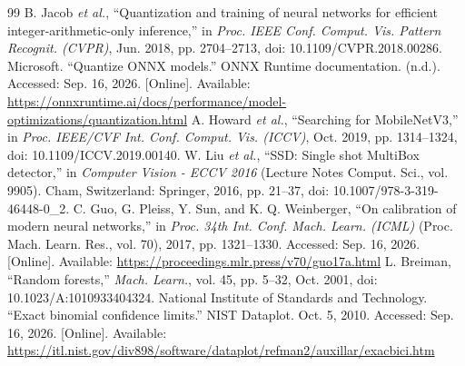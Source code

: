 \begin{thebibliography}{99}
B. Jacob \textit{et al.}, ``Quantization and training of neural networks for efficient integer-arithmetic-only inference,'' in \textit{Proc. IEEE Conf. Comput. Vis. Pattern Recognit. (CVPR)}, Jun. 2018, pp. 2704--2713, doi: 10.1109/CVPR.2018.00286.
Microsoft. ``Quantize ONNX models.'' ONNX Runtime documentation. (n.d.). Accessed: Sep. 16, 2026. [Online]. Available: \url{https://onnxruntime.ai/docs/performance/model-optimizations/quantization.html}
A. Howard \textit{et al.}, ``Searching for MobileNetV3,'' in \textit{Proc. IEEE/CVF Int. Conf. Comput. Vis. (ICCV)}, Oct. 2019, pp. 1314--1324, doi: 10.1109/ICCV.2019.00140.
W. Liu \textit{et al.}, ``SSD: Single shot MultiBox detector,'' in \textit{Computer Vision - ECCV 2016} (Lecture Notes Comput. Sci., vol. 9905). Cham, Switzerland: Springer, 2016, pp. 21--37, doi: 10.1007/978-3-319-46448-0\_2.
C. Guo, G. Pleiss, Y. Sun, and K. Q. Weinberger, ``On calibration of modern neural networks,'' in \textit{Proc. 34th Int. Conf. Mach. Learn. (ICML)} (Proc. Mach. Learn. Res., vol. 70), 2017, pp. 1321--1330. Accessed: Sep. 16, 2026. [Online]. Available: \url{https://proceedings.mlr.press/v70/guo17a.html}
L. Breiman, ``Random forests,'' \textit{Mach. Learn.}, vol. 45, pp. 5--32, Oct. 2001, doi: 10.1023/A:1010933404324.
National Institute of Standards and Technology. ``Exact binomial confidence limits.'' NIST Dataplot. Oct. 5, 2010. Accessed: Sep. 16, 2026. [Online]. Available: \url{https://itl.nist.gov/div898/software/dataplot/refman2/auxillar/exacbici.htm}
\end{thebibliography}
